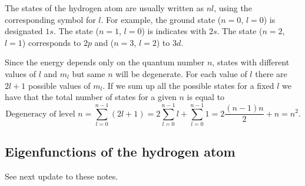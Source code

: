 \documentclass[../Main/chem331-notes.tex]{subfiles}
\begin{document}
The states of the hydrogen atom are usually written as $nl$, using the corresponding symbol for $l$.
For example, the ground state ($n=0$, $l=0$) is designated $1s$. The state ($n=1$, $l=0$) is indicates with $2s$. The state ($n=2$, $l=1$) corresponds to $2p$ and ($n=3$, $l=2$) to $3d$.

Since the energy depends only on the quantum number $n$, states with different values of $l$ and $m_l$ but same $n$ will be degenerate.
For each value of $l$ there are $2l +1$ possible values of $m_l$. If we sum up all the possible states for a fixed $l$ we have that the total number of states for a given $n$ is equal to
\begin{equation}
\text{Degeneracy of level } n = \sum_{l = 0}^{n-1} (2l +1) = 2 \sum_{l = 0}^{n-1} l + \sum_{l = 0}^{n-1} 1
= 2 \frac{(n - 1) n}{2} + n = n^2.
\end{equation}

\subsection{Eigenfunctions of the hydrogen atom}
See next update to these notes.
\end{document}

